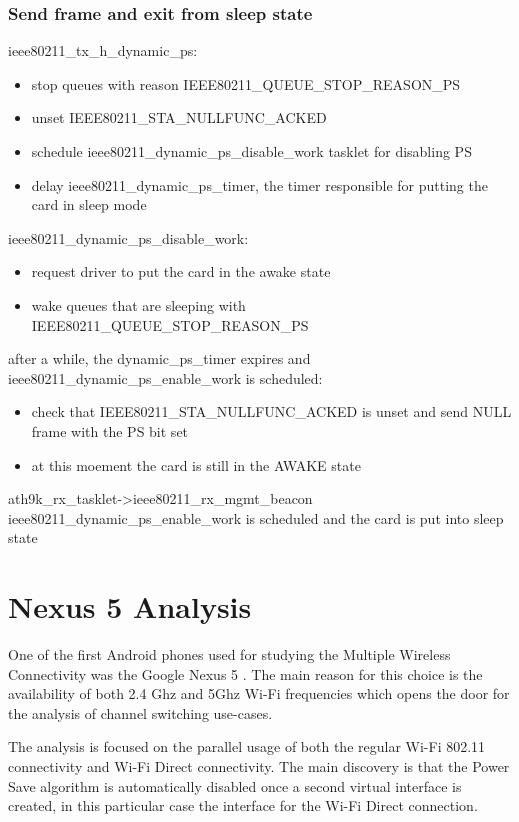 \subsection{Send frame and exit from sleep state}
\label{sub-sec:analysis-3}
ieee80211_tx_h_dynamic_ps:
\begin{itemize}
\item stop queues with reason IEEE80211_QUEUE_STOP_REASON_PS
\item unset IEEE80211_STA_NULLFUNC_ACKED
\item schedule ieee80211_dynamic_ps_disable_work tasklet for disabling PS
\item delay ieee80211_dynamic_ps_timer, the timer responsible for putting the card in sleep mode
\end{itemize}
ieee80211_dynamic_ps_disable_work:
\begin{itemize}
\item request driver to put the card in the awake state
\item wake queues that are sleeping with IEEE80211_QUEUE_STOP_REASON_PS
\end{itemize}
after a while, the dynamic_ps_timer expires and ieee80211_dynamic_ps_enable_work is scheduled:
\begin{itemize}
\item check that IEEE80211_STA_NULLFUNC_ACKED is unset and send NULL frame with the PS bit set
\item at this moement the card is still in the AWAKE state
\end{itemize}
ath9k_rx_tasklet->ieee80211_rx_mgmt_beacon
ieee80211_dynamic_ps_enable_work is scheduled and the card is put into sleep state

\chapter{Nexus 5 Analysis}

One of the first Android phones used for studying the Multiple Wireless Connectivity was the Google Nexus 5 \cite{cite-nexus5}. The main reason for this choice is the availability of both 2.4 Ghz and 5Ghz Wi-Fi frequencies which opens the door for the analysis of channel switching use-cases. 

The analysis is focused on the parallel usage of both the regular Wi-Fi 802.11 connectivity and Wi-Fi Direct connectivity. The main discovery is that the Power Save algorithm is automatically disabled once a second virtual interface is created, in this particular case the interface for the Wi-Fi Direct connection. 

